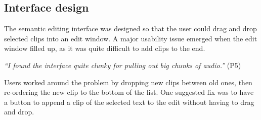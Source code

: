 








\subsection{Interface design}
The semantic editing interface was designed so that the user could drag and
drop selected clips into an edit window. A major usability issue emerged when
the edit window filled up, as it was quite difficult to add clips to the end.

\textit{``I found the interface quite clunky for pulling out big chunks of
  audio.''} (P5)

Users worked around the problem by dropping new clips between old ones, then
re-ordering the new clip to the bottom of the list. One suggested fix was to
have a button to append a clip of the selected text to the edit without having
to drag and drop.

